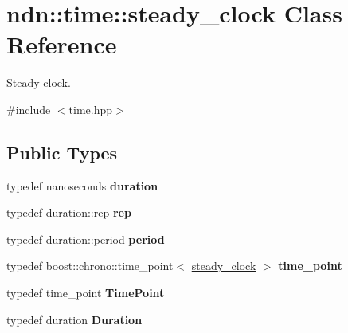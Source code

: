 \hypertarget{classndn_1_1time_1_1steady__clock}{}\section{ndn\+:\+:time\+:\+:steady\+\_\+clock Class Reference}
\label{classndn_1_1time_1_1steady__clock}


Steady clock.  




{\ttfamily \#include $<$time.\+hpp$>$}

\subsection*{Public Types}
\begin{DoxyCompactItemize}
\item 
typedef nanoseconds {\bfseries duration}\hypertarget{classndn_1_1time_1_1steady__clock_a80afc6e289def0d2d988f4b6308a1f89}{}\label{classndn_1_1time_1_1steady__clock_a80afc6e289def0d2d988f4b6308a1f89}

\item 
typedef duration\+::rep {\bfseries rep}\hypertarget{classndn_1_1time_1_1steady__clock_a71b4a094353a04954f9254604defbcaf}{}\label{classndn_1_1time_1_1steady__clock_a71b4a094353a04954f9254604defbcaf}

\item 
typedef duration\+::period {\bfseries period}\hypertarget{classndn_1_1time_1_1steady__clock_acc7a51c52d1de51a9a5fae4797276c99}{}\label{classndn_1_1time_1_1steady__clock_acc7a51c52d1de51a9a5fae4797276c99}

\item 
typedef boost\+::chrono\+::time\+\_\+point$<$ \hyperlink{classndn_1_1time_1_1steady__clock}{steady\+\_\+clock} $>$ {\bfseries time\+\_\+point}\hypertarget{classndn_1_1time_1_1steady__clock_a388e568c1422cbd3704c749969d728f6}{}\label{classndn_1_1time_1_1steady__clock_a388e568c1422cbd3704c749969d728f6}

\item 
typedef time\+\_\+point {\bfseries Time\+Point}\hypertarget{classndn_1_1time_1_1steady__clock_a1c3721454162ba5fbc9d320b94def2bd}{}\label{classndn_1_1time_1_1steady__clock_a1c3721454162ba5fbc9d320b94def2bd}

\item 
typedef duration {\bfseries Duration}\hypertarget{classndn_1_1time_1_1steady__clock_a986704ae88fa51a777f2b17635d2d5a3}{}\label{classndn_1_1time_1_1steady__clock_a986704ae88fa51a777f2b17635d2d5a3}

\end{DoxyCompactItemize}
